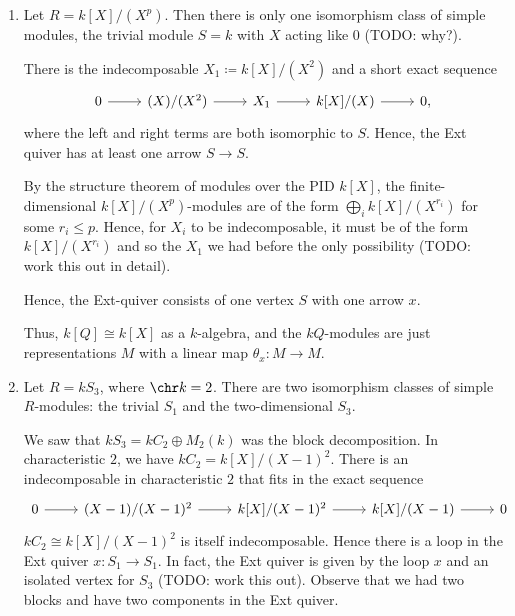 \begin{enumerate}
	\item Let $R = k[X]/(X^p)$. Then there is only one isomorphism class of
		simple modules, the trivial module $S = k$ with $X$ acting like $0$
		(TODO: why?).

		There is the indecomposable $X_1\coloneqq k[X]/(X^2)$ and a short exact sequence
		\[\begin{tikzcd}
			0\ar[r] & (X)/(X^2)\ar[r] & X_1\ar[r] & k[X]/(X)\ar[r] & 0,
		\end{tikzcd}\]
		where the left and right terms are both isomorphic to $S$. Hence, the
		Ext quiver has at least one arrow $S\to S$.

		By the structure theorem of modules over the PID $k[X]$, the
		finite-dimensional $k[X]/(X^p)$-modules are of the form
		$\bigoplus_i k[X]/(X^{r_i})$ for some $r_i\leq p$. Hence, for $X_i$ to
		be indecomposable, it must be of the form $k[X]/(X^{r_i})$ and
		so the $X_1$ we had before the only possibility (TODO: work this
		out in detail).

		Hence, the Ext-quiver consists of one vertex $S$ with one arrow $x$.

		Thus, $k[Q]\cong k[X]$ as a $k$-algebra, and the $kQ$-modules are just
		representations $M$ with a linear map $\theta_x\colon M\to M$.

	\item Let $R = kS_3$, where $\chr k = 2$. There are two isomorphism classes of
		simple $R$-modules: the trivial $S_1$ and the two-dimensional $S_3$.

		We saw that $kS_3= kC_2\oplus M_2(k)$ was the block decomposition.
		In characteristic $2$, we have $kC_2 = k[X]/(X-1)^2$. There is an
		indecomposable in characteristic $2$ that fits in the exact
		sequence
		\[\begin{tikzcd}
			0\ar[r] & (X-1)/(X-1)^2\ar[r] & k[X]/(X-1)^2\ar[r] & k[X]/(X-1)\ar[r]& 0
		\end{tikzcd}\]
		$kC_2\cong k[X]/(X-1)^2$ is itself indecomposable. Hence there is a loop
		in the Ext quiver $x\colon S_1\to S_1$. In fact, the Ext quiver is
		given by the loop $x$ and an isolated vertex for $S_3$ (TODO: work this out).
		Observe that we had two blocks and have two components in the Ext quiver.


\end{enumerate}
